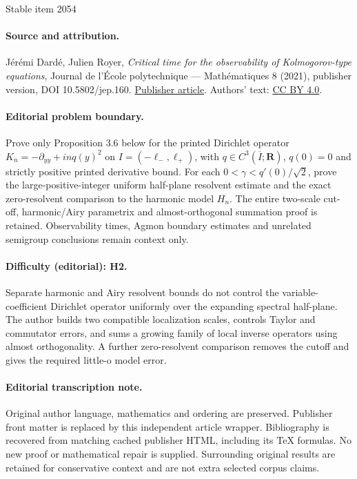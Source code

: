 \documentclass[11pt]{article}
\numberwithin{equation}{section}
\theoremstyle{plain}
\theoremstyle{definition}
\newcommand{\1}{\mathds 1}
\begin{document}
\begin{center}{\Large Stable item 2054}\end{center}
\paragraph{Source and attribution.}
Jérémi Dardé, Julien Royer, \emph{Critical time for the observability of Kolmogorov-type equations}, Journal de l’École polytechnique — Mathématiques 8 (2021), publisher version, DOI 10.5802/jep.160. \href{https://jep.centre-mersenne.org/articles/10.5802/jep.160/}{Publisher article}. Authors' text: \href{https://creativecommons.org/licenses/by/4.0/}{CC BY 4.0}.
\paragraph{Editorial problem boundary.}
Prove only Proposition 3.6 below for the printed Dirichlet operator \(K_n=-\partial_{yy}+in q(y)^2\) on \(I=(-\ell_-,\ell_+)\), with \(q\in C^3(\overline I;\mathbf R)\), \(q(0)=0\) and strictly positive printed derivative bound. For each \(0<\gamma<q'(0)/\sqrt2\), prove the large-positive-integer uniform half-plane resolvent estimate and the exact zero-resolvent comparison to the harmonic model \(H_n\). The entire two-scale cut-off, harmonic/Airy parametrix and almost-orthogonal summation proof is retained. Observability times, Agmon boundary estimates and unrelated semigroup conclusions remain context only.
\paragraph{Difficulty (editorial): H2.}
Separate harmonic and Airy resolvent bounds do not control the variable-coefficient Dirichlet operator uniformly over the expanding spectral half-plane. The author builds two compatible localization scales, controls Taylor and commutator errors, and sums a growing family of local inverse operators using almost orthogonality. A further zero-resolvent comparison removes the cutoff and gives the required little-o model error.
\paragraph{Editorial transcription note.}
Original author language, mathematics and ordering are preserved. Publisher front matter is replaced by this independent article wrapper. Bibliography is recovered from matching cached publisher HTML, including its TeX formulas. No new proof or mathematical repair is supplied. Surrounding original results are retained for conservative context and are not extra selected corpus claims.
\clearpage
\end{document}
